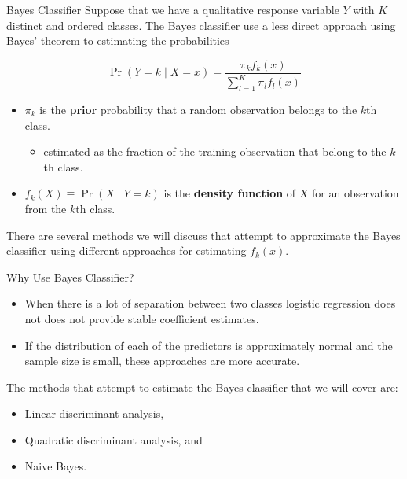 \documentclass[
  ignorenonframetext,
  aspectratio=169,
]{beamer}
\providecommand{\tightlist}{%
  \setlength{\itemsep}{0pt}\setlength{\parskip}{0pt}}\usepackage{longtable,booktabs,array}
\begin{document}
\begin{frame}{Bayes Classifier}
\protect\hypertarget{bayes-classifier}{}
Suppose that we have a qualitative response variable \(Y\) with \(K\)
distinct and ordered classes. The Bayes classifier use a less direct
approach using Bayes' theorem to estimating the probabilities

\[\operatorname{Pr}(Y=k \mid X=x)=\frac{\pi_{k} f_{k}(x)}{\sum_{l=1}^{K} \pi_{l} f_{l}(x)}\]

\begin{itemize}
\item
  \(\pi_k\) is the \textbf{prior} probability that a random observation
  belongs to the \(k\)th class.

  \begin{itemize}
  \tightlist
  \item
    estimated as the fraction of the training observation that belong to
    the \(k\)th class.
  \end{itemize}
\item
  \(f_{k}(X) \equiv \operatorname{Pr}(X \mid Y=k)\) is the
  \textbf{density function} of \(X\) for an observation from the \(k\)th
  class.
\end{itemize}

There are several methods we will discuss that attempt to approximate
the Bayes classifier using different approaches for estimating
\(f_k(x)\).
\end{frame}

\begin{frame}{Why Use Bayes Classifier?}
\protect\hypertarget{why-use-bayes-classifier}{}
\begin{itemize}
\item
  When there is \alert{a lot of separation between two classes} logistic
  regression does not does not provide stable coefficient estimates.
\item
  If the
  \alert{distribution of each of the predictors is approximately normal and the sample size is small},
  these approaches are more accurate.
\end{itemize}

The methods that attempt to estimate the Bayes classifier that we will
cover are:

\begin{itemize}
\item
  Linear discriminant analysis,
\item
  Quadratic discriminant analysis, and
\item
  Naive Bayes.
\end{itemize}
\end{frame}
\end{document}
